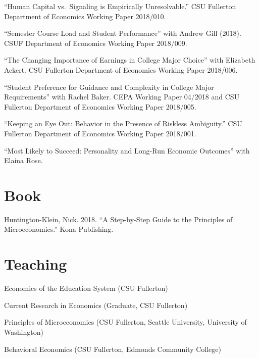 \documentclass[11pt,a4paper,sans]{moderncv}
\begin{document}
 \begin{hangparas}{.25in}{1} 
 ``Human Capital vs.~Signaling is Empirically Unresolvable.'' CSU Fullerton Department of Economics Working Paper 2018/010.



``Semester Course Load and Student Performance'' with Andrew Gill (2018). CSUF Department of Economics Working Paper 2018/009.



``The Changing Importance of Earnings in College Major Choice'' with Elizabeth Ackert. CSU Fullerton Department of Economics Working Paper 2018/006.



``Student Preference for Guidance and Complexity in College Major Requirements'' with Rachel Baker. CEPA Working Paper 04/2018 and CSU Fullerton Department of Economics Working Paper 2018/005.



``Keeping an Eye Out: Behavior in the Presence of Riskless Ambiguity.'' CSU Fullerton Department of Economics Working Paper 2018/001.



``Most Likely to Succeed: Personality and Long-Run Economic Outcomes'' with Elaina Rose.

 
 \end{hangparas}


\section{Book}  
  
Huntington-Klein, Nick. 2018. ``A Step-by-Step Guide to the Principles of Microeconomics.'' Kona Publishing.



\section{Teaching}  
  
Economics of the Education System (CSU Fullerton)



Current Research in Economics (Graduate, CSU Fullerton)



Principles of Microeconomics (CSU Fullerton, Seattle University, University of Washington)



Behavioral Economics (CSU Fullerton, Edmonds Community College)
\end{document}
